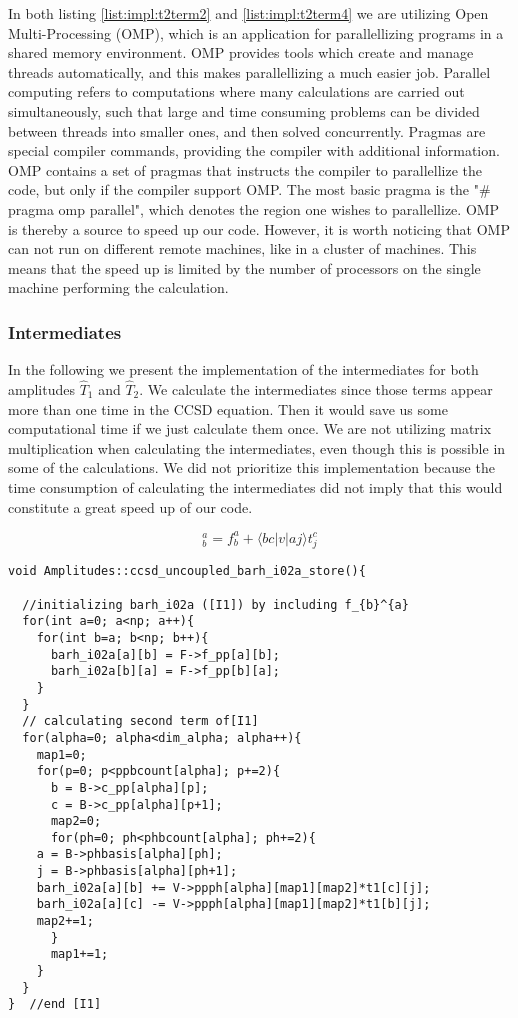 In both listing \ref{list:impl:t2term2} and \ref{list:impl:t2term4} we are utilizing Open Multi-Processing (OMP), which is an application for parallellizing programs in a shared memory environment. OMP provides tools which create and manage threads automatically, and this makes parallellizing a much easier job. Parallel computing refers to computations where many calculations are carried out simultaneously, such that large and time consuming problems can be divided between threads into smaller ones, and then solved concurrently. Pragmas are special compiler commands, providing the compiler with additional information. OMP contains a set of pragmas that instructs the compiler to parallellize the code, but only if the compiler support OMP. The most basic pragma is the "$\#$pragma omp parallel", which denotes the region one wishes to parallellize. OMP is thereby a source to speed up our code. However, it is worth noticing that OMP can not run on different remote machines, like in a cluster of machines. This means that the speed up is limited by the number of processors on the single machine performing the calculation.  

\subsubsection{Intermediates}

In the following we present the implementation of the intermediates for both amplitudes $\hat{T}_1$ and $\hat{T}_2$. We calculate the intermediates since those terms appear more than one time in the CCSD equation. Then it would save us some computational time if we just calculate them once. We are not utilizing matrix multiplication when calculating the intermediates, even though this is possible in some of the calculations. We did not prioritize this implementation because the time consumption of calculating the intermediates did not imply that this would constitute a great speed up of our code.

\begin{equation*}
[I1]_{b}^{a}=f_{b}^{a}+\langle bc|v|aj\rangle t_j^c
\end{equation*}
\begin{lstlisting}[label={list:impl:intermediate1},caption={implementation of I1 in the amp1 class function ccsd\_uncoupled\_barh\_i02a\_store}]
void Amplitudes::ccsd_uncoupled_barh_i02a_store(){
 
  //initializing barh_i02a ([I1]) by including f_{b}^{a}
  for(int a=0; a<np; a++){
    for(int b=a; b<np; b++){
      barh_i02a[a][b] = F->f_pp[a][b];
      barh_i02a[b][a] = F->f_pp[b][a];
    }
  } 
  // calculating second term of[I1]
  for(alpha=0; alpha<dim_alpha; alpha++){
    map1=0;
    for(p=0; p<ppbcount[alpha]; p+=2){
      b = B->c_pp[alpha][p];
      c = B->c_pp[alpha][p+1];
      map2=0;
      for(ph=0; ph<phbcount[alpha]; ph+=2){   
	a = B->phbasis[alpha][ph];
	j = B->phbasis[alpha][ph+1];
	barh_i02a[a][b] += V->ppph[alpha][map1][map2]*t1[c][j];
	barh_i02a[a][c] -= V->ppph[alpha][map1][map2]*t1[b][j];
	map2+=1;
      }
      map1+=1;
    }
  }
}  //end [I1]
\end{lstlisting}

